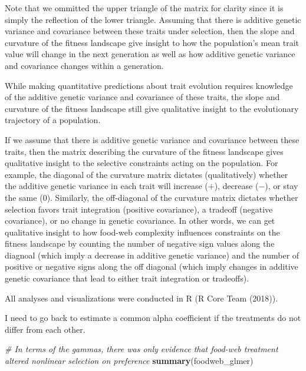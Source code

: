 \documentclass[]{elsarticle} %
\newenvironment{Shaded}{\begin{snugshade}}{\end{snugshade}}
\newcommand{\KeywordTok}[1]{\textcolor[rgb]{0.13,0.29,0.53}{\textbf{#1}}}
\newcommand{\CommentTok}[1]{\textcolor[rgb]{0.56,0.35,0.01}{\textit{#1}}}
\newcommand{\NormalTok}[1]{#1}
\begin{document}
Note that we ommitted the upper triangle of the matrix for clarity since
it is simply the reflection of the lower triangle. Assuming that there
is additive genetic variance and covariance between these traits under
selection, then the slope and curvature of the fitness landscape give
insight to how the population's mean trait value will change in the next
generation as well as how additive genetic variance and covariance
changes within a generation.

While making quantitative predictions about trait evolution requires
knowledge of the additive genetic variance and covariance of these
traits, the slope and curvature of the fitness landscape still give
qualitative insight to the evolutionary trajectory of a population.

If we assume that there is additive genetic variance and covariance
between these traits, then the matrix describing the curvature of the
fitness landscape gives qualitative insight to the selective constraints
acting on the population. For example, the diagonal of the curvature
matrix dictates (qualitatively) whether the additive genetic variance in
each trait will increase (\(+\)), decrease (\(-\)), or stay the same
(\(0\)). Similarly, the off-diagonal of the curvature matrix dictates
whether selection favors trait integration (positive covariance), a
tradeoff (negative covariance), or no change in genetic covariance. In
other words, we can get qualitative insight to how food-web complexity
influences constraints on the fitness landscape by counting the number
of negative sign values along the diagnoal (which imply a decrease in
additive genetic variance) and the number of positive or negative signs
along the off diagonal (which imply changes in additive genetic
covariance that lead to either trait integration or tradeoffs).

All analyses and visualizations were conducted in R (R Core Team
(2018)).

I need to go back to estimate a common alpha coefficient if the
treatments do not differ from each other.

\begin{Shaded}
\begin{Highlighting}[]
\CommentTok{# In terms of the gammas, there was only evidence that food-web treatment altered nonlinear selection on preference}
\KeywordTok{summary}\NormalTok{(foodweb_glmer)}
\end{Highlighting}
\end{Shaded}
\end{document}
